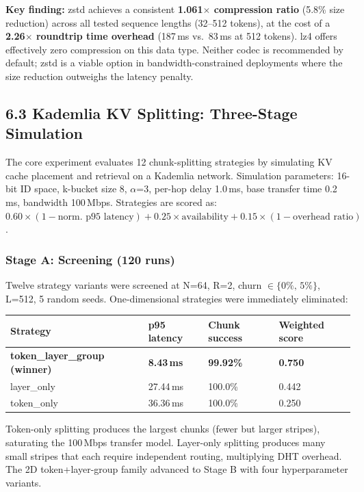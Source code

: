 \documentclass[11pt]{article}
\begin{document}
\textbf{Key finding:} zstd achieves a consistent \textbf{1.061$\times$
compression ratio} (5.8\% size reduction) across all tested sequence
lengths (32--512 tokens), at the cost of a \textbf{2.26$\times$ roundtrip
time overhead} (187\,ms vs.\ 83\,ms at 512 tokens). lz4 offers effectively
zero compression on this data type. Neither codec is recommended by
default; zstd is a viable option in bandwidth-constrained deployments
where the size reduction outweighs the latency penalty.

\subsection{6.3 Kademlia KV Splitting: Three-Stage Simulation}

The core experiment evaluates 12 chunk-splitting strategies by simulating
KV cache placement and retrieval on a Kademlia network. Simulation
parameters: 16-bit ID space, k-bucket size 8, $\alpha$=3, per-hop delay
1.0\,ms, base transfer time 0.2\,ms, bandwidth 100\,Mbps. Strategies are
scored as: $0.60 \times (1 - \text{norm.\ p95 latency}) + 0.25 \times
\text{availability} + 0.15 \times (1 - \text{overhead ratio})$.

\subsubsection{Stage A: Screening (120 runs)}

Twelve strategy variants were screened at N=64, R=2, churn
$\in \{0\%,\,5\%\}$, L=512, 5 random seeds. One-dimensional strategies
were immediately eliminated:

\begin{longtable}[]{@{}llll@{}}
\toprule
Strategy & p95 latency & Chunk success & Weighted score \\
\midrule
\endhead
\bottomrule
\endlastfoot
\textbf{token\_layer\_group (winner)} & \textbf{8.43\,ms} & \textbf{99.92\%} & \textbf{0.750} \\
layer\_only & 27.44\,ms & 100.0\% & 0.442 \\
token\_only & 36.36\,ms & 100.0\% & 0.250 \\
\end{longtable}

Token-only splitting produces the largest chunks (fewer but larger
stripes), saturating the 100\,Mbps transfer model. Layer-only splitting
produces many small stripes that each require independent routing,
multiplying DHT overhead. The 2D token+layer-group family advanced to
Stage B with four hyperparameter variants.
\end{document}
